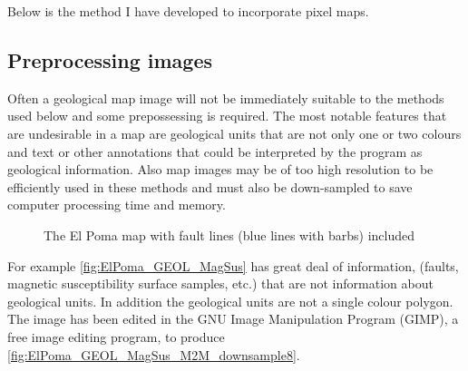 Below is the method I have developed to incorporate pixel maps.

\subsection{ Preprocessing images}
\label{subsec:Preprocessing images}

Often a geological map image will not be immediately suitable to the methods used below and some prepossessing is required. The most notable features that are undesirable in a map are geological units that are not only one or two colours and text or other annotations that could be interpreted by the program as geological information. Also map images may be of too high resolution to be efficiently used in these methods and must also be down-sampled to save  computer processing time and memory.

 \begin{figure} [h]
    \centering
    \caption{The El Poma map with fault lines (blue lines with barbs) included}
    \label{fig:ElPoma_GEOL_MagSus}
\end{figure}

For example \autoref{fig:ElPoma_GEOL_MagSus} has great deal of information, (faults, magnetic susceptibility surface samples, etc.) that are not information about geological units. In addition the geological units are not a single colour polygon. The image has been edited in the GNU Image Manipulation Program (GIMP), a free image editing program, to produce \autoref{fig:ElPoma_GEOL_MagSus_M2M_downsample8}. 

